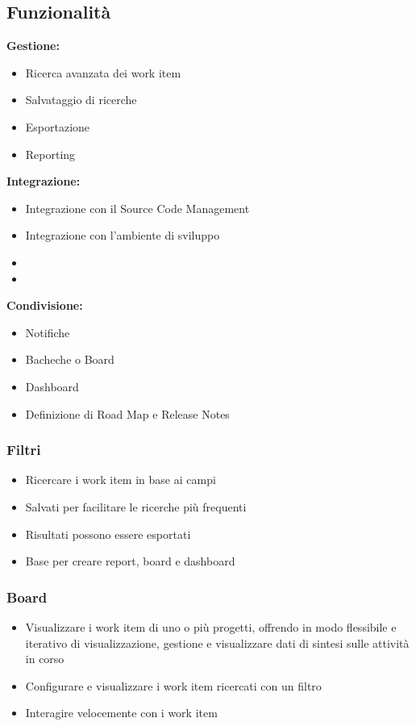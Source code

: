 \subsection{Funzionalità}
\begin{multicols}{3}
    \raggedright
    \textbf{Gestione:}
    \begin{itemize}
        \item Ricerca avanzata dei work item
        \item Salvataggio di ricerche
        \item Esportazione
        \item Reporting
    \end{itemize}
    \columnbreak
    \textbf{Integrazione:}
    \begin{itemize}
        \item Integrazione con il Source Code Management
        \item Integrazione con l'ambiente di sviluppo
        \item[]
        \item[]
    \end{itemize}
    \columnbreak
    \textbf{Condivisione:}
    \begin{itemize}
        \item Notifiche
        \item Bacheche o Board
        \item Dashboard
        \item Definizione di Road Map e Release Notes
    \end{itemize}
\end{multicols}

\subsubsection{Filtri}
\begin{itemize}
    \item Ricercare i work item in base ai campi
    \item Salvati per facilitare le ricerche più frequenti
    \item Risultati possono essere esportati
    \item Base per creare report, board e dashboard
\end{itemize}

\subsubsection{Board}
\begin{itemize}
    \item Visualizzare i work item di uno o più progetti, offrendo in modo flessibile e iterativo di visualizzazione, gestione e visualizzare dati di sintesi sulle attività in corso
    \item Configurare e visualizzare i work item ricercati con un filtro
    \item Interagire velocemente con i work item
\end{itemize}

